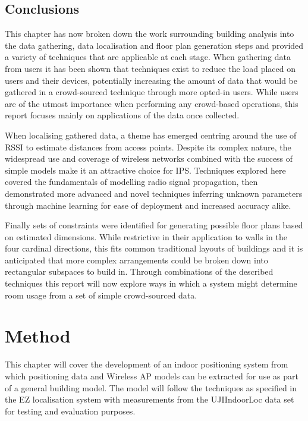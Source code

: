 \documentclass{UoYCSproject}
\begin{document}
        \section{Conclusions}
        
	        This chapter has now broken down the work surrounding building analysis into the data gathering, data localisation and floor plan generation steps and provided a variety of techniques that are applicable at each stage. When gathering data from users it has been shown that techniques exist to reduce the load placed on users and their devices, potentially increasing the amount of data that would be gathered in a crowd-sourced technique through more opted-in users. While users are of the utmost importance when performing any crowd-based operations, this report focuses mainly on applications of the data once collected.
            
            When localising gathered data, a theme has emerged centring around the use of RSSI to estimate distances from access points. Despite its complex nature, the  widespread use and coverage of wireless networks combined with the success of simple models make it an attractive choice for IPS. Techniques explored here covered the fundamentals of modelling radio signal propagation, then demonstrated more advanced and novel techniques inferring unknown parameters through machine learning for ease of deployment and increased accuracy alike.
            
            Finally sets of constraints were identified for generating possible floor plans based on estimated dimensions. While restrictive in their application to walls in the four cardinal directions, this fits common traditional layouts of buildings and it is anticipated that more complex arrangements could be broken down into rectangular subspaces to build in. Through combinations of the described techniques this report will now explore ways in which a system might determine room usage from a set of simple crowd-sourced data.

	\chapter{Method}
	
		This chapter will cover the development of an indoor positioning system from which positioning data and Wireless AP models can be extracted for use as part of a general building model. The  model will follow the techniques as specified in the EZ localisation system \citep{chintalapudi2010indoor} with measurements from the UJIIndoorLoc data set for testing and evaluation purposes.
		
\end{document}
